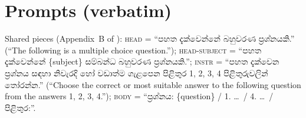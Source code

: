 \documentclass[10pt,a4paper]{article}
\newcommand{\si}[1]{{\sinhalafont #1}}
\begin{document}
\appendix
\section{Prompts (verbatim)}\label{app:prompts}
Shared pieces (Appendix~B of \cite{pramodya2025}): \textsc{head} = ``\si{පහත දැක්වෙන්නේ බහුවරණ ප්‍රශ්නයකි.}''
(``The following is a multiple choice question.''); \textsc{head-subject} = ``\si{පහත දැක්වෙන්නේ} \{subject\}
\si{සම්බන්ධ බහුවරණ ප්‍රශ්නයකි.}''; \textsc{instr} = ``\si{පහත දැක්වෙන ප්‍රශ්නය සඳහා නිවැරදි හෝ වඩාත්ම ගැළපෙන පිළිතුර
1, 2, 3, 4 පිළිතුරුවලින් තෝරන්න.}'' (``Choose the correct or most suitable answer to the following question from the
answers 1, 2, 3, 4.''); \textsc{body} = ``\si{ප්‍රශ්නය}: \{question\} / 1. \ldots\ / 4. \ldots\ / \si{පිළිතුර}:''.
\end{document}
